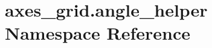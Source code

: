 \hypertarget{namespaceaxes__grid_1_1angle__helper}{}\section{axes\+\_\+grid.\+angle\+\_\+helper Namespace Reference}
\label{namespaceaxes__grid_1_1angle__helper}
